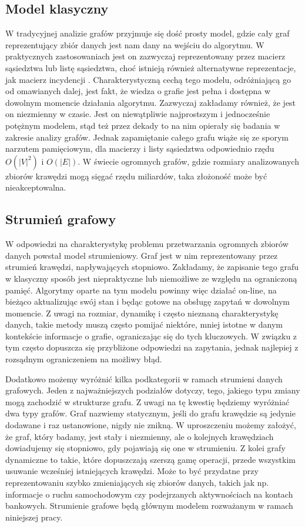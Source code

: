     \subsection{Model klasyczny}
        W tradycyjnej analizie grafów przyjmuje się dość prosty model, gdzie cały graf reprezentujący zbiór danych jest nam dany na wejściu do algorytmu. W praktycznych zastosowaniach jest on zazwyczaj reprezentowany przez macierz sąsiedztwa lub listę sąsiedztwa, choć istnieją również alternatywne reprezentacje, jak macierz incydencji \cite{Wilson_2015}. Charakterystyczną cechą tego modelu, odróżniającą go od omawianych dalej, jest fakt, że  wiedza o grafie jest pełna i dostępna w dowolnym momencie działania algorytmu. Zazwyczaj zakładamy również, że jest on niezmienny w czasie. Jest on niewątpliwie najprostszym i jednocześnie potężnym modelem, stąd też przez dekady to na nim opierały się badania w zakresie analizy grafów. Jednak zapamiętanie całego grafu wiąże się ze sporym narzutem pamięciowym, dla macierzy i listy sąsiedztwa odpowiednio rzędu $O(|V|^2)$ i $O(|E|)$. W świecie ogromnych grafów, gdzie rozmiary analizowanych zbiorów krawędzi mogą sięgać rzędu miliardów, taka złożoność może być nieakceptowalna. 

    \subsection{Strumień grafowy}
        W odpowiedzi na charakterystykę problemu przetwarzania ogromnych zbiorów danych powstał model strumieniowy. Graf jest w nim reprezentowany przez strumień krawędzi, napływających stopniowo. Zakładamy, że zapisanie tego grafu w klasyczny sposób jest niepraktyczne lub niemożliwe ze względu na ograniczoną pamięć. Algorytmy oparte na tym modelu powinny więc działać on-line, na bieżąco aktualizując swój stan i będąc gotowe na obsługę zapytań w dowolnym momencie. Z uwagi na rozmiar, dynamikę i często nieznaną charakterystykę danych, takie metody muszą często pomijać niektóre, mniej istotne w danym kontekście informacje o grafie, ograniczając się do tych kluczowych. W związku z tym często dopuszcza się przybliżone odpowiedzi na zapytania, jednak najlepiej z rozsądnym ograniczeniem na możliwy błąd. 

        Dodatkowo możemy wyróżnić kilka podkategorii w ramach strumieni danych grafowych. Jeden z najważniejszych podziałów dotyczy, tego, jakiego typu zmiany mogą zachodzić w strukturze grafu. Z uwagi na tę kwestię będziemy wyróżniać dwa typy grafów. Graf nazwiemy statycznym, jeśli do grafu krawędzie są jedynie dodawane i raz ustanowione, nigdy nie znikną. W uproszczeniu możemy założyć, że graf, który badamy, jest stały i niezmienny, ale o kolejnych krawędziach dowiadujemy się stopniowo, gdy pojawiają się one w strumieniu. Z kolei grafy dynamiczne to takie, które dopuszczają szerszą gamę operacji, przede wszystkim usuwanie wcześniej istniejących krawędzi. Może to być przydatne przy reprezentowaniu szybko zmieniających się zbiorów danych, takich jak np. informacje o ruchu samochodowym czy podejrzanych aktywnościach na kontach bankowych. Strumienie grafowe będą głównym modelem rozważanym w ramach niniejszej pracy. 

